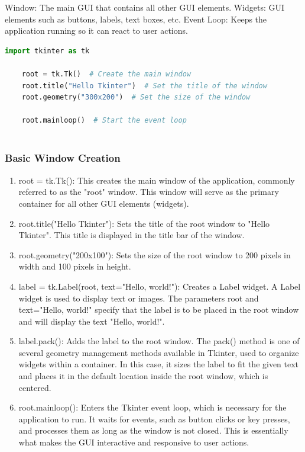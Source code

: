 Window: The main GUI that contains all other GUI elements.
Widgets: GUI elements such as buttons, labels, text boxes, etc.
Event Loop: Keeps the application running so it can react to user actions.

\begin{lstlisting}[language=Python]
    import tkinter as tk
    
    root = tk.Tk()  # Create the main window
    root.title("Hello Tkinter")  # Set the title of the window
    root.geometry("300x200")  # Set the size of the window
    
    root.mainloop()  # Start the event loop
    
\end{lstlisting}

\subsubsection{Basic Window Creation}\label{BasicWindow}

\begin{enumerate}
    \item root = tk.Tk(): This creates the main window of the application, commonly referred to as the "root" window. This window will serve as the primary container for all other GUI elements (widgets).
    
    \item root.title("Hello Tkinter"): Sets the title of the root window to "Hello Tkinter". This title is displayed in the title bar of the window.
    
    \item root.geometry("200x100"): Sets the size of the root window to 200 pixels in width and 100 pixels in height.
    
    \item label = tk.Label(root, text="Hello, world!"): Creates a Label widget. A Label widget is used to display text or images. The parameters root and text="Hello, world!" specify that the label is to be placed in the root window and will display the text "Hello, world!".
    
    \item label.pack(): Adds the label to the root window. The pack() method is one of several geometry management methods available in Tkinter, used to organize widgets within a container. In this case, it sizes the label to fit the given text and places it in the default location inside the root window, which is centered.
    
    \item root.mainloop(): Enters the Tkinter event loop, which is necessary for the application to run. It waits for events, such as button clicks or key presses, and processes them as long as the window is not closed. This is essentially what makes the GUI interactive and responsive to user actions.
\end{enumerate}

